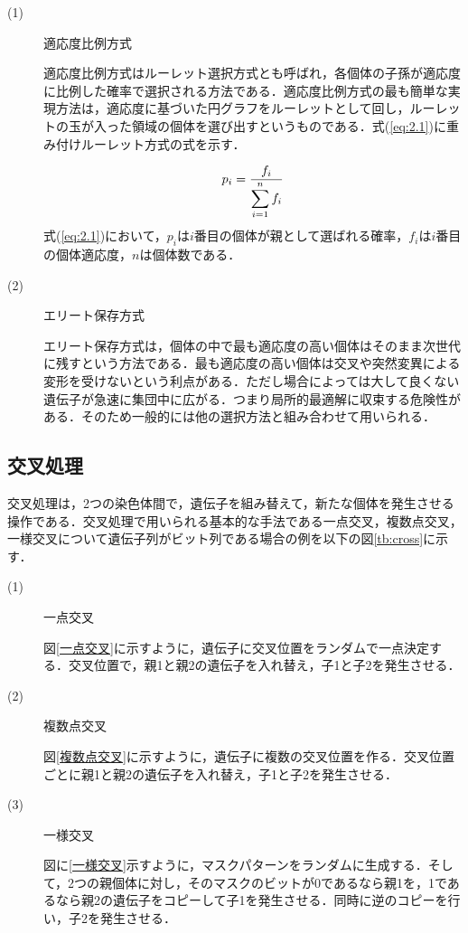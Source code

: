 \begin{description}
\item[ (1) ]適応度比例方式

適応度比例方式はルーレット選択方式とも呼ばれ，各個体の子孫が適応度に比例した確率で選択される方法である．適応度比例方式の最も簡単な実現方法は，適応度に基づいた円グラフをルーレットとして回し，ルーレットの玉が入った領域の個体を選び出すというものである．式(\ref{eq:2.1})に重み付けルーレット方式の式を示す．



\begin{equation}
\vspace{1.0cm}
{p_i}=\frac{f_i}{\displaystyle\sum_{i=1}^{n}f_i}
\label{eq:2.1}
\vspace{-0.5cm}
\end{equation}
式(\ref{eq:2.1})において，$p_i$は$i$番目の個体が親として選ばれる確率，$f_i$は$i$番目の個体適応度，$n$は個体数である．

\item[ (2) ]エリート保存方式

エリート保存方式は，個体の中で最も適応度の高い個体はそのまま次世代に残すという方法である．最も適応度の高い個体は交叉や突然変異による変形を受けないという利点がある．ただし場合によっては大して良くない遺伝子が急速に集団中に広がる．つまり局所的最適解に収束する危険性がある．そのため一般的には他の選択方法と組み合わせて用いられる．

\end{description}

\newpage

\subsection{交叉処理}
\label{sec2.1.4}

交叉処理は，2つの染色体間で，遺伝子を組み替えて，新たな個体を発生させる操作である．交叉処理で用いられる基本的な手法である一点交叉，複数点交叉，一様交叉について遺伝子列がビット列である場合の例を以下の図\ref{tb:cross}に示す．



\begin{description}
\item[ (1) ]一点交叉

図\ref{一点交叉}に示すように，遺伝子に交叉位置をランダムで一点決定する．交叉位置で，親1と親2の遺伝子を入れ替え，子1と子2を発生させる．


\item[ (2) ]複数点交叉

図\ref{複数点交叉}に示すように，遺伝子に複数の交叉位置を作る．交叉位置ごとに親1と親2の遺伝子を入れ替え，子1と子2を発生させる．

\item[ (3) ]一様交叉

図に\ref{一様交叉}示すように，マスクパターンをランダムに生成する．そして，2つの親個体に対し，そのマスクのビットが0であるなら親1を，1であるなら親2の遺伝子をコピーして子1を発生させる．同時に逆のコピーを行い，子2を発生させる．

\end{description}


